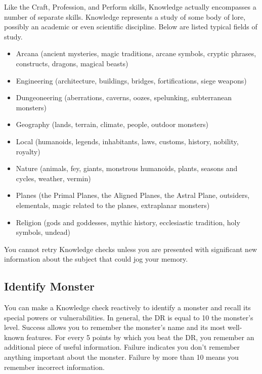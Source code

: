         Like the Craft, Profession, and Perform skills, Knowledge actually encompasses a number of separate skills. Knowledge represents a study of some body of lore, possibly an academic or even scientific discipline. Below are listed typical fields of study.
        \begin{itemize}
            \item Arcana (ancient mysteries, magic traditions, arcane symbols,
                cryptic phrases, constructs, dragons, magical beasts)
            \item Engineering (architecture, buildings, bridges, fortifications, siege weapons)
            \item Dungeoneering (aberrations, caverns, oozes, spelunking, subterranean monsters)
            \item Geography (lands, terrain, climate, people, outdoor monsters)
            \item Local (humanoids, legends, inhabitants, laws, customs, history, nobility, royalty)
            \item Nature (animals, fey, giants, monstrous humanoids, plants, seasons and cycles, weather, vermin)
            \item Planes (the Primal Planes, the Aligned Planes, the Astral Plane,
                outsiders, elementals, magic related to the planes, extraplanar monsters)
            \item Religion (gods and goddesses, mythic history, ecclesiastic tradition, holy symbols, undead)
        \end{itemize}

        You cannot retry Knowledge checks unless you are presented with significant new information about the subject that could jog your memory.

    \subsection{Identify Monster}
        You can make a Knowledge check reactively to identify a monster and recall its special powers or vulnerabilities. In general, the DR is equal to 10 \add the monster's level. Success allows you to remember the monster's name and its most well-known features. For every 5 points by which you beat the DR, you remember an additional piece of useful information. Failure indicates you don't remember anything important about the monster. Failure by more than 10 means you remember incorrect information.

